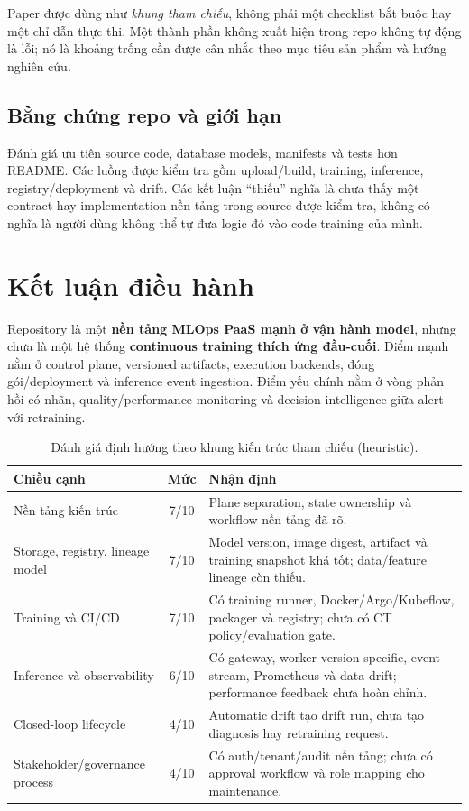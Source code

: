 \documentclass[11pt,a4paper]{article}
\begin{document}
Paper được dùng như \emph{khung tham chiếu}, không phải một checklist bắt buộc hay một chỉ dẫn thực thi. Một thành phần không xuất hiện trong repo không tự động là lỗi; nó là khoảng trống cần được cân nhắc theo mục tiêu sản phẩm và hướng nghiên cứu.

\subsection{Bằng chứng repo và giới hạn}
Đánh giá ưu tiên source code, database models, manifests và tests hơn README. Các luồng được kiểm tra gồm upload/build, training, inference, registry/deployment và drift. Các kết luận ``thiếu'' nghĩa là chưa thấy một contract hay implementation nền tảng trong source được kiểm tra, không có nghĩa là người dùng không thể tự đưa logic đó vào code training của mình.

\section{Kết luận điều hành}

Repository là một \textbf{nền tảng MLOps PaaS mạnh ở vận hành model}, nhưng chưa là một hệ thống \textbf{continuous training thích ứng đầu-cuối}. Điểm mạnh nằm ở control plane, versioned artifacts, execution backends, đóng gói/deployment và inference event ingestion. Điểm yếu chính nằm ở vòng phản hồi có nhãn, quality/performance monitoring và decision intelligence giữa alert với retraining.

\begin{table}[ht]
\centering
\caption{Đánh giá định hướng theo khung kiến trúc tham chiếu (heuristic).}
\begin{tabularx}{\linewidth}{@{}l c Y@{}}
\toprule
\textbf{Chiều cạnh} & \textbf{Mức} & \textbf{Nhận định} \\
\midrule
Nền tảng kiến trúc & 7/10 & Plane separation, state ownership và workflow nền tảng đã rõ. \\
Storage, registry, lineage model & 7/10 & Model version, image digest, artifact và training snapshot khá tốt; data/feature lineage còn thiếu. \\
Training và CI/CD & 7/10 & Có training runner, Docker/Argo/Kubeflow, packager và registry; chưa có CT policy/evaluation gate. \\
Inference và observability & 6/10 & Có gateway, worker version-specific, event stream, Prometheus và data drift; performance feedback chưa hoàn chỉnh. \\
Closed-loop lifecycle & 4/10 & Automatic drift tạo drift run, chưa tạo diagnosis hay retraining request. \\
Stakeholder/governance process & 4/10 & Có auth/tenant/audit nền tảng; chưa có approval workflow và role mapping cho maintenance. \\
\bottomrule
\end{tabularx}
\end{table}
\end{document}

